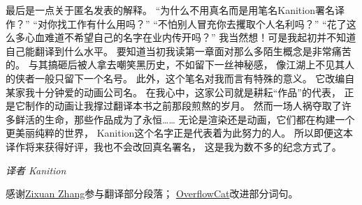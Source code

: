 最后是一点关于匿名发表的解释。
“为什么不用真名而是用笔名Kanition署名译作？”
“对你找工作有什么用吗？”
“不怕别人冒充你去攫取个人名利吗？”
“花了这么多心血难道不希望自己的名字在业内传开吗？”
我当然想！可是我起初并不知道自己能翻译到什么水平。
要知道当初我读第一章面对那么多陌生概念是非常痛苦的。
与其搞砸后被人拿去嘲笑黑历史，不如留下一丝神秘感，
像江湖上不见其人的侠者一般只留下一个名号。
此外，这个笔名对我而言有特殊的意义。
它改编自某家我十分钟爱的动画公司名。
在我心中，这家公司就是耕耘“作品”的代表，
正是它制作的动画让我撑过翻译本书之前那段煎熬的岁月。
然而一场人祸夺取了许多鲜活的生命，那些作品成为了永恒……
无论是渲染还是动画，它们都在构建一个更美丽纯粹的世界，
Kanition这个名字正是代表着为此努力的人。
所以即便这本译作将来获得好评，我也不会改回真名署名，
这是我为数不多的纪念方式了。

\vspace{15pt}
{\hfill {\itshape 译者 Kanition}\qquad}

\vspace{15pt}

感谢\href{https://zixuan-zhang.com}{Zixuan Zhang}参与翻译部分段落；
\href{https://github.com/OverflowCat}{OverflowCat}改进部分词句。